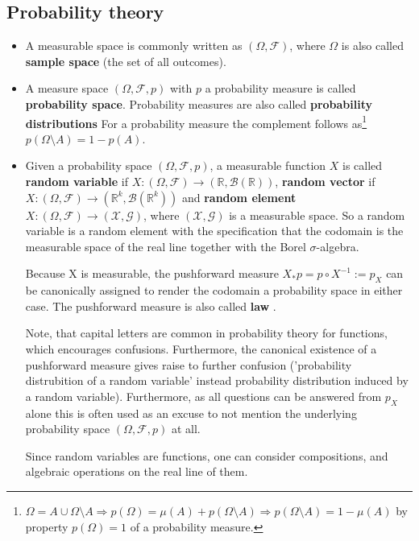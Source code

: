 \documentclass[10pt,a4paper]{article}
\begin{document}
\subsection{Probability theory}
\begin{itemize}
\item A measurable space is commonly written as $(\Omega, \mathcal F)$, where $\Omega$ is also called \textbf{sample space} (the set of all outcomes).   
\item 
A measure space $(\Omega, \mathcal F, p)$ with $p$ a probability measure is called  \textbf{probability space}. Probability measures are also called \textbf{probability distributions} 
For a probability measure the complement follows as\footnote{$\Omega = A \cup \Omega \setminus A \Rightarrow  p(\Omega) = \mu(A)  + p(\Omega \setminus A) \Rightarrow   p(\Omega \setminus A)  = 1- \mu(A)$ by property $p(\Omega) = 1$ of a probability measure.}  $p(\Omega \setminus A) = 1 - p(A)$. 

\item Given a probability space $(\Omega, \mathcal F, p)$,  a measurable  function $X$  is called 
\textbf{random variable} if $X: (\Omega, \mathcal F) \rightarrow (\mathbb R,  \mathcal B(\mathbb R))$, \textbf{random vector} if  $X: (\Omega, \mathcal F) \rightarrow (\mathbb R^k,  \mathcal B(\mathbb R^k))$ and \textbf{random element} $X: (\Omega, \mathcal F) \rightarrow (\mathcal X,  \mathcal G)$, where $(\mathcal X,  \mathcal G)$ is a measurable space.  So a random variable is a random element with the specification that the codomain is the  measurable space of the real line together with the Borel $\sigma$-algebra.  

Because X is measurable,  the pushforward measure $X_*p = p \circ X^{-1} := p_X$ can be canonically assigned to render the codomain a probability space in either case. The pushforward measure is also called \textbf{law }. 

Note, that capital letters are common in probability theory for functions, which encourages confusions. Furthermore, the canonical existence of a pushforward measure gives raise to further confusion ('probability distrubition of a random variable' instead probability distribution induced by a random variable). Furthermore, as all questions can be answered from $p_X$ alone this is often used as an excuse to not mention the underlying probability space   $(\Omega, \mathcal F, p)$ at all. 

Since random variables are functions, one can consider compositions, and algebraic operations on the real line of them. 
\end{itemize}
\end{document}
